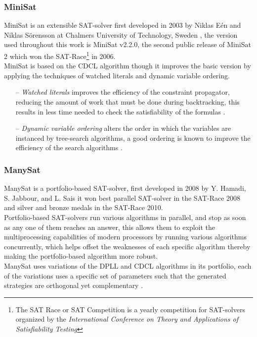 \subsubsection{MiniSat}

MiniSat is an extensible SAT-solver first developed in 2003 by Niklas Eén and Niklas Sörensson at Chalmers University of Technology, Sweden \parencite{Een2000}, the version used throughout this work is MiniSat v2.2.0, the second public release of MiniSat 2 which won the SAT-Race\footnote{The SAT Race or SAT Competition is a yearly competition for SAT-solvers organized by the \textit{International Conference on Theory and Applications of Satisfiability Testing}} in 2006.
\\MiniSat is based on the CDCL algorithm though it improves the basic version by applying the techniques of watched literals and dynamic variable ordering.
	
\begin{itemize}
	\item[--] \textit{Watched literals} improves the efficiency of the constraint propagator, reducing the amount of work that must be done during backtracking, this results in less time needed to check the satisfiability of the formulas \parencite{Gent2006}.
	\item[--] \textit{Dynamic variable ordering} alters the order in which the variables are instanced by tree-search algorithms, a good ordering is known to improve the efficiency of the search algorithms \parencite{Bacchus1995}.
\end{itemize}

\subsubsection{ManySat}

ManySat is a portfolio-based SAT-solver, first developed in 2008 by Y. Hamadi, S. Jabbour, and L. Sais it won best parallel SAT-solver in the SAT-Race 2008 and silver and bronze medals in the SAT-Race 2010.
\\Portfolio-based SAT-solvers run various algorithms in parallel, and stop as soon as any one of them reaches an answer, this allows them to exploit the multiprocessing capabilities of modern processors by running various algorithms concurrently, which helps offset the weaknesses of each specific algorithm thereby making the portfolio-based algorithm more robust.
\\ManySat uses variations of the DPLL and CDCL algorithms in its portfolio, each of the variations uses a specific set of parameters such that the generated strategies are orthogonal yet complementary \parencite{Hamadi2009}.


